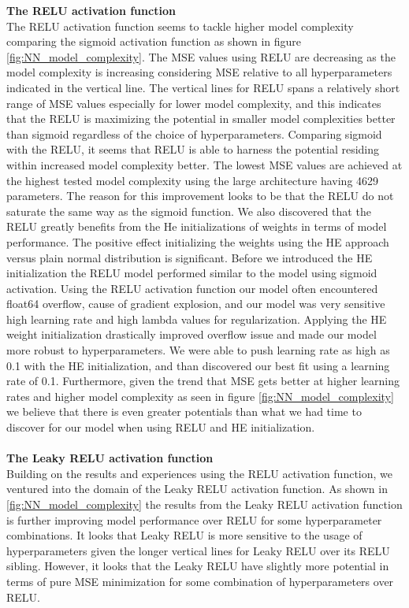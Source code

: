 \documentclass
[twocolumn,
secnumarabic,
nobibnotes,
aps,
prl,
reprint,
groupedaddress,
amsmath,
amssymb
]{revtex4-2}
\begin{document}
\textbf{The RELU activation function}\\
The RELU activation function seems to tackle higher model complexity comparing the sigmoid activation function as shown in figure \ref{fig:NN_model_complexity}. The MSE values using RELU are decreasing as the model complexity is increasing considering MSE relative to all hyperparameters indicated in the vertical line. The vertical lines for RELU spans a relatively short range of MSE values especially for lower model complexity, and this indicates that the RELU is maximizing the potential in smaller model complexities better than sigmoid regardless of the choice of hyperparameters. Comparing sigmoid with the RELU, it seems that RELU is able to harness the potential residing within increased model complexity better. The lowest MSE values are achieved at the highest tested model complexity using the large architecture having 4629 parameters. The reason for this improvement looks to be that the RELU do not saturate the same way as the sigmoid function. We also discovered that the RELU greatly benefits from the He initializations of weights \cite{He2015} in terms of model performance. The positive effect initializing the weights using the HE approach versus plain normal distribution is significant. Before we introduced the HE initialization the RELU model performed similar to the model using sigmoid activation. Using the RELU activation function our model often encountered float64 overflow, cause of gradient explosion, and our model was very sensitive high learning rate and high lambda values for regularization. Applying the HE weight initialization drastically improved overflow issue and made our model more robust to hyperparameters. We were able to push learning rate as high as 0.1 with the HE initialization, and than discovered our best fit using a learning rate of 0.1. Furthermore, given the trend that MSE gets better at higher learning rates and higher model complexity as seen in figure \ref{fig:NN_model_complexity} we believe that there is even greater potentials than what we had time to discover for our model when using RELU and HE initialization.\\\\

\textbf{The Leaky RELU activation function}\\
Building on the results and experiences using the RELU activation function, we ventured into the domain of the Leaky RELU activation function. As shown in \ref{fig:NN_model_complexity} the results from the Leaky RELU activation function is further improving model performance over RELU for some hyperparameter combinations. It looks that Leaky RELU is more sensitive to the usage of hyperparameters given the longer vertical lines for Leaky RELU over its RELU sibling. However, it looks that the Leaky RELU have slightly more potential in terms of pure MSE minimization for some combination of hyperparameters over RELU.
\end{document}
